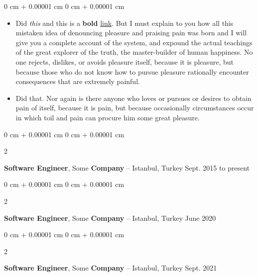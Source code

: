 \documentclass[10pt, letterpaper]{article}
\newenvironment{highlights}{
    \begin{itemize}[
        topsep=0.10 cm,
        parsep=0.10 cm,
        partopsep=0pt,
        itemsep=0pt,
        leftmargin=0 cm + 10pt
    ]
}{
    \end{itemize}
} %
\newenvironment{onecolentry}{
    \begin{adjustwidth}{
        0 cm + 0.00001 cm
    }{
        0 cm + 0.00001 cm
    }
}{
    \end{adjustwidth}
} %
\newenvironment{twocolentry}[2][]{
    \onecolentry
    \def\secondColumn{#2}
    \setcolumnwidth{\fill, 4.5 cm}
    \begin{paracol}{2}
}{
    \switchcolumn \raggedleft \secondColumn
    \end{paracol}
    \endonecolentry
} %
\begin{document}
        \vspace{0.10 cm}
        \begin{onecolentry}
            \begin{highlights}
                \item Did \textit{this} and this is a \textbf{bold} \href{https://example.com}{link}. But I must explain to you how all this mistaken idea of denouncing pleasure and praising pain was born and I will give you a complete account of the system, and expound the actual teachings of the great explorer of the truth, the master-builder of human happiness. No one rejects, dislikes, or avoids pleasure itself, because it is pleasure, but because those who do not know how to pursue pleasure rationally encounter consequences that are extremely painful.
                \item Did that. Nor again is there anyone who loves or pursues or desires to obtain pain of itself, because it is pain, but because occasionally circumstances occur in which toil and pain can procure him some great pleasure.
            \end{highlights}
        \end{onecolentry}


        \vspace{0.2 cm}

        \begin{twocolentry}{
            Sept. 2015 to present
        }
            \textbf{Software Engineer}, Some \textbf{Company} -- Istanbul, Turkey\end{twocolentry}



        \vspace{0.2 cm}

        \begin{twocolentry}{
            June 2020
        }
            \textbf{Software Engineer}, Some \textbf{Company} -- Istanbul, Turkey\end{twocolentry}



        \vspace{0.2 cm}

        \begin{twocolentry}{
            Sept. 2021
        }
            \textbf{Software Engineer}, Some \textbf{Company} -- Istanbul, Turkey\end{twocolentry}



        \vspace{0.2 cm}
\end{document}
